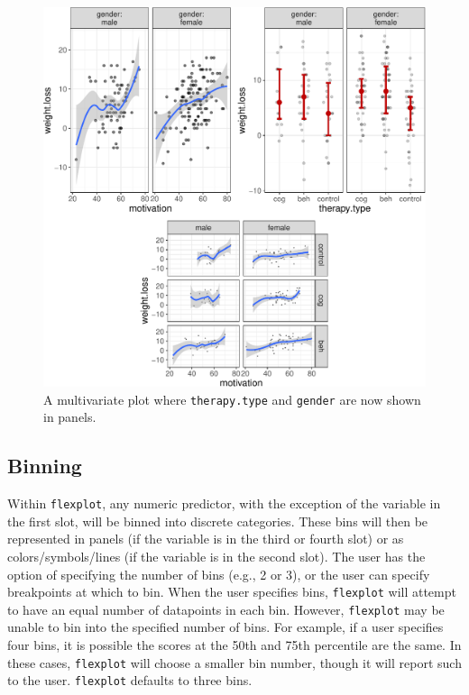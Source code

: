 \documentclass[
  english,
  man]{apa6}
\begin{document}
\normalsize

\small

\begin{figure}
\centering
\includegraphics{flexplot_psychmeth_files/figure-latex/panels-1.pdf}
\caption{\label{fig:panels}A multivariate plot where \texttt{therapy.type} and \texttt{gender} are now shown in panels. \label{fig:panels}}
\end{figure}

\normalsize

\hypertarget{binning}{%
\subsection{Binning}\label{binning}}

Within \texttt{flexplot}, any numeric predictor, with the exception of the variable in the first slot, will be binned into discrete categories. These bins will then be represented in panels (if the variable is in the third or fourth slot) or as colors/symbols/lines (if the variable is in the second slot). The user has the option of specifying the number of bins (e.g., 2 or 3), or the user can specify breakpoints at which to bin. When the user specifies bins, \texttt{flexplot} will attempt to have an equal number of datapoints in each bin. However, \texttt{flexplot} may be unable to bin into the specified number of bins. For example, if a user specifies four bins, it is possible the scores at the 50th and 75th percentile are the same. In these cases, \texttt{flexplot} will choose a smaller bin number, though it will report such to the user. \texttt{flexplot} defaults to three bins.
\end{document}
